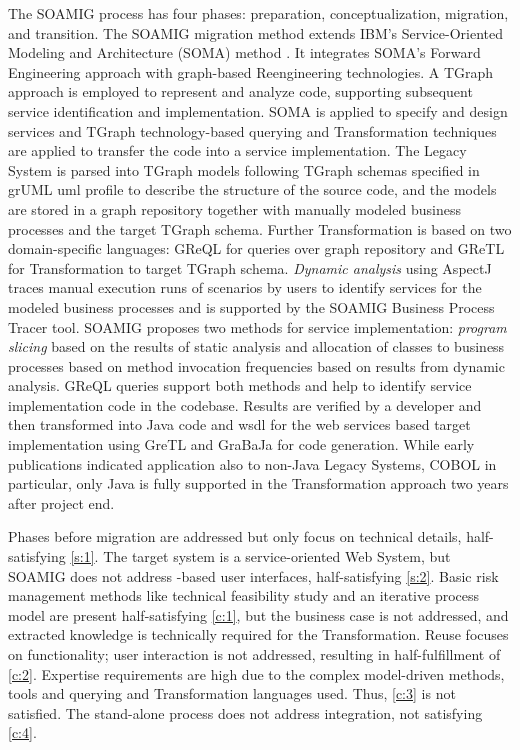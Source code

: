 The SOAMIG process \autocite{Zillmann2011SOAMIG} has four phases: preparation, conceptualization, migration, and transition.
The SOAMIG migration method extends IBM's Service-Oriented Modeling and Architecture (SOMA) method \autocite{Arsanjani2008SOMA}.
It integrates SOMA's \gls{Forward Engineering} approach with graph-based \gls{Reengineering} technologies.
A TGraph approach is employed to represent and analyze  code, supporting subsequent service identification and implementation.
SOMA is applied to specify and design services and TGraph technology-based querying and \gls{Transformation} techniques are applied to transfer the  code into a service implementation.
The \gls{Legacy System} is parsed into TGraph models following TGraph schemas specified in grUML \gls{uml} profile to describe the structure of the  source code, and the models are stored in a graph repository together with manually modeled business processes and the target TGraph schema.
Further \gls{Transformation} is based on two domain-specific languages: GReQL for queries over graph repository and GReTL for \gls{Transformation} to target TGraph schema.
\emph{Dynamic analysis} using AspectJ traces manual execution runs of scenarios by users to identify services for the modeled business processes and is supported by the SOAMIG Business Process Tracer tool.
SOAMIG proposes two methods for service implementation: \emph{program slicing} based on the results of static analysis and allocation of classes to business processes based on method invocation frequencies based on results from dynamic analysis.
GReQL queries support both methods and help to identify service implementation code in the  codebase.
Results are verified by a developer and then transformed into Java code and \gls{wsdl} for the \gls{web} services based target implementation using GreTL and GraBaJa for code generation.
While early publications indicated application also to non-Java \glspl{Legacy System}, COBOL in particular, only Java is fully supported in the \gls{Transformation} approach two years after project end.

Phases before migration are addressed but only focus on technical details, half-satisfying \cref{s:1}.
The \gls{target system} is a service-oriented \gls{Web System}, but SOAMIG does not address -based user interfaces, half-satisfying \cref{s:2}.
Basic \gls{risk management} methods like technical feasibility study and an iterative process model are present half-satisfying \cref{c:1}, but the \gls{business case} is not addressed, and extracted knowledge is technically required for the \gls{Transformation}.
Reuse focuses on functionality; user interaction is not addressed, resulting in half-fulfillment of \cref{c:2}.
Expertise requirements are high due to the complex model-driven methods, tools and querying and \gls{Transformation} languages used.
Thus, \cref{c:3} is not satisfied.
The stand-alone process does not address integration, not satisfying \cref{c:4}.

